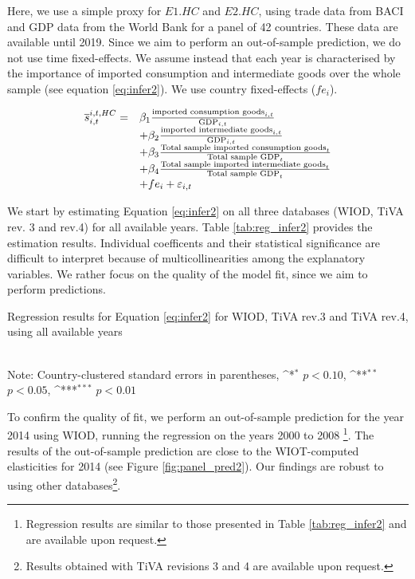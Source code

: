 \documentclass[11pt,a4paper]{paper} %
\begin{document}
Here, we use a simple proxy for $E1.HC$ and $E2.HC$, using trade data from BACI and GDP data from the World Bank for a panel of 42 countries.
These data are available until 2019. 
Since we aim to perform an out-of-sample prediction, we do not use time fixed-effects. We assume instead that each year is characterised by the importance of imported consumption and intermediate goods over the whole sample (see equation \ref{eq:infer2}).
We use country fixed-effects ($fe_{i}$).

 \begin{equation}
	\begin{array}{llll}
		\overline{s}_{i,t}^{i,t,HC}=  &  \beta_1  \frac{\textnormal{imported consumption goods}_{i,t}}{\textnormal{GDP}_{i,t}} \\ & + \beta_2 \frac{\textnormal{imported intermediate goods}_{i,t}}{\textnormal{GDP}_{i,t}} \\
		& +  \beta_3  \frac{\textnormal{Total sample imported consumption goods}_{t}}{\textnormal{Total sample GDP}_{t}} \\
		& + \beta_4 \frac{\textnormal{Total sample imported intermediate goods}_{t}}{\textnormal{Total sample GDP}_{t}} \\
		& +fe_{i}+\varepsilon_{i,t}
	\end{array}
	\label{eq:infer2}
\end{equation}

We start by estimating Equation \ref{eq:infer2} on all three databases (WIOD, TiVA rev. 3 and rev.4) for all available years.
Table \ref{tab:reg_infer2} provides the estimation results.
Individual coefficents and their statistical significance are difficult to interpret because of multicollinearities among the explanatory variables.
We rather focus on the quality of the model fit, since we aim to perform predictions.



\begin{table}[htbp]\centering
	\def\sym#1{\ifmmode^{#1}\else\(^{#1}\)\fi}
	\caption{Regression results for Equation \ref{eq:infer2} for WIOD, TiVA rev.3 and TiVA rev.4, using all available years }

\\
Note: Country-clustered standard errors in parentheses, \sym{*} \(p<0.10\), \sym{**} \(p<0.05\), \sym{***} \(p<0.01\)
\label{tab:reg_infer2}
\end{table}

To confirm the quality of fit, we perform an out-of-sample prediction for the year 2014 using WIOD, running the regression on the years 2000 to 2008 \footnote{Regression results are similar to those presented in Table \ref{tab:reg_infer2} and are available upon request.}.
The results of the out-of-sample prediction are close to the WIOT-computed elasticities for 2014  (see Figure \ref{fig:panel_pred2}). 
Our findings are robust to using other databases\footnote{Results obtained with TiVA revisions 3 and 4 are available upon request.}.
\end{document}
